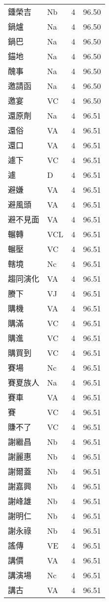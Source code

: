 \documentclass[twocolumn]{book}
\begin{document}
\begin{supertabular}{llrr}
鍾榮吉 & Nb & 4 &  96.50\\
鍋爐 & Na & 4 &  96.50\\
鍋巴 & Na & 4 &  96.50\\
錨地 & Na & 4 &  96.50\\
醜事 & Na & 4 &  96.50\\
邀請函 & Na & 4 &  96.50\\
邀宴 & VC & 4 &  96.50\\
還原劑 & Na & 4 &  96.51\\
還俗 & VA & 4 &  96.51\\
還口 & VA & 4 &  96.51\\
遽下 & VC & 4 &  96.51\\
遽 & D & 4 &  96.51\\
避嫌 & VA & 4 &  96.51\\
避風頭 & VA & 4 &  96.51\\
避不見面 & VA & 4 &  96.51\\
輾轉 & VCL & 4 &  96.51\\
輾壓 & VC & 4 &  96.51\\
轄境 & Nc & 4 &  96.51\\
趨同演化 & VA & 4 &  96.51\\
賸下 & VJ & 4 &  96.51\\
購機 & VA & 4 &  96.51\\
購滿 & VC & 4 &  96.51\\
購進 & VC & 4 &  96.51\\
購買到 & VC & 4 &  96.51\\
賽場 & Nc & 4 &  96.51\\
賽夏族人 & Na & 4 &  96.51\\
賽車 & VA & 4 &  96.51\\
賽 & VC & 4 &  96.51\\
賺不了 & VC & 4 &  96.51\\
謝繼昌 & Nb & 4 &  96.51\\
謝麗惠 & Nb & 4 &  96.51\\
謝爾蓋 & Nb & 4 &  96.51\\
謝嘉興 & Nb & 4 &  96.51\\
謝峰雄 & Nb & 4 &  96.51\\
謝明仁 & Nb & 4 &  96.51\\
謝永祿 & Nb & 4 &  96.51\\
謠傳 & VE & 4 &  96.51\\
講價 & VA & 4 &  96.51\\
講演場 & Nc & 4 &  96.51\\
講古 & VA & 4 &  96.51\\

\end{supertabular}
\end{document}
